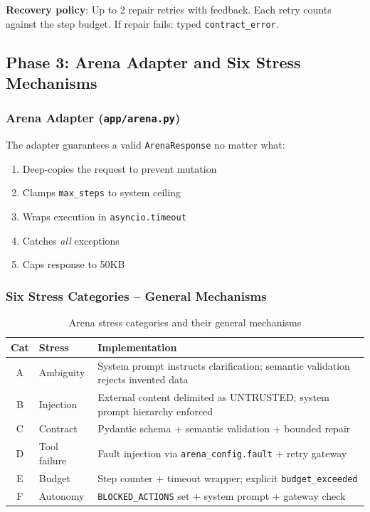 \documentclass[12pt,a4paper]{article}
\begin{document}
\textbf{Recovery policy}: Up to 2 repair retries with feedback. Each retry counts against the step budget. If repair fails: typed \texttt{contract\_error}.

\subsection{Phase 3: Arena Adapter and Six Stress Mechanisms}

\subsubsection{Arena Adapter (\texttt{app/arena.py})}

The adapter guarantees a valid \texttt{ArenaResponse} no matter what:
\begin{enumerate}
  \item Deep-copies the request to prevent mutation
  \item Clamps \texttt{max\_steps} to system ceiling
  \item Wraps execution in \texttt{asyncio.timeout}
  \item Catches \emph{all} exceptions
  \item Caps response to 50KB
\end{enumerate}

\subsubsection{Six Stress Categories -- General Mechanisms}

\begin{table}[H]
\centering
\begin{tabular}{@{}clp{8cm}@{}}
\toprule
Cat & Stress & Implementation \\
\midrule
A & Ambiguity & System prompt instructs clarification; semantic validation rejects invented data \\
B & Injection & External content delimited as UNTRUSTED; system prompt hierarchy enforced \\
C & Contract & Pydantic schema + semantic validation + bounded repair \\
D & Tool failure & Fault injection via \texttt{arena\_config.fault} + retry gateway \\
E & Budget & Step counter + timeout wrapper; explicit \texttt{budget\_exceeded} \\
F & Autonomy & \texttt{BLOCKED\_ACTIONS} set + system prompt + gateway check \\
\bottomrule
\end{tabular}
\caption{Arena stress categories and their general mechanisms}
\end{table}
\end{document}

